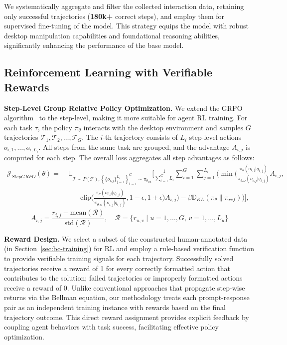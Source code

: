 We systematically aggregate and filter the collected interaction data, retaining only successful trajectories (\textbf{180k+} correct steps), and employ them for supervised fine-tuning of the model. 
This strategy equips the model with robust desktop manipulation capabilities and foundational reasoning abilities, significantly enhancing the performance of the base model.

\subsection{Reinforcement Learning with Verifiable Rewards}\label{sec:rlvr}

\textbf{Step-Level Group Relative Policy Optimization.}
We extend the GRPO algorithm~\citep{shao2024deepseekmath} to the step-level, making it more suitable for agent RL training. For each task $\tau$, the policy $\pi_{\theta}$ interacts with the desktop environment and samples $G$ trajectories $\mathcal{T}_1, \mathcal{T}_2, \ldots, \mathcal{T}_G$.
The $i$-th trajectory consists of $L_i$ step-level actions $o_{i,1}, \ldots, o_{i,L_i}$.
All steps from the same task are grouped, and the advantage $A_{i,j}$ is computed for each step.
The overall loss aggregates all step advantages as follows:
\begingroup\small
\begin{align*}
\mathcal{J}_{StepGRPO}(\theta) = &\; \mathbb{E}_{\mathcal{T} \sim P(\mathcal{T}), \left\{\{o_{i,j}\}_{j=1}^{L_i}\right\}_{i=1}^{G} \sim \pi_{\theta_{old}}} \Bigg[\frac{1}{\sum_{i=1}^{G} L_i} \sum_{i=1}^{G} \sum_{j=1}^{L_i} \Bigg(\min \Bigg( \frac{\pi_{\theta}(o_{i,j}|q_{i,j})}{\pi_{\theta_{old}}(o_{i,j}|q_{i,j})} A_{i,j}, \\
    & \qquad \text{clip} \Big( \frac{\pi_{\theta}(o_{i,j}|q_{i,j})}{\pi_{\theta_{old}}(o_{i,j}|q_{i,j})}, 1 - \epsilon, 1 + \epsilon \Big) A_{i,j} \Bigg) - \beta \mathbb{D}_{KL}(\pi_{\theta} \| \pi_{ref}) \Bigg) \Bigg],
\end{align*}
\[
A_{i,j} = \frac{r_{i,j} - \text{mean}(\mathcal{R})}{\text{std}(\mathcal{R})}, \quad \mathcal{R} = \{ r_{u,v} \mid u=1,\dots,G, \, v=1,\dots,L_u \}
\]
\endgroup

\textbf{Reward Design.}
We select a subset of the constructed human-annotated data (in Section~\ref{sec:bc-training}) for RL and employ a rule-based verification function to provide verifiable training signals for each trajectory. 
Successfully solved trajectories receive a reward of 1 for every correctly formatted action that contributes to the solution; failed trajectories or improperly formatted actions receive a reward of 0. Unlike conventional approaches that propagate step-wise returns via the Bellman equation, our methodology treats each prompt-response pair as an independent training instance with rewards based on the final trajectory outcome. This direct reward assignment provides explicit feedback by coupling agent behaviors with task success, facilitating effective policy optimization.


